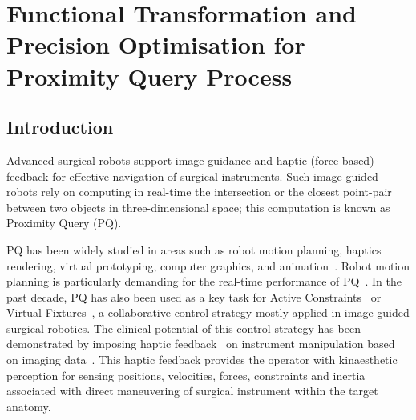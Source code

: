 
\chapter[Functional Transformation \& Precision Optimisation for PQ Process]{Functional Transformation and Precision Optimisation for Proximity Query Process}

\section{Introduction}
\label{sec:intro}

Advanced surgical robots support image guidance and haptic (force-based) feedback for effective navigation of surgical instruments. 
Such image-guided robots rely on computing in real-time the intersection or the closest point-pair
between two objects in three-dimensional space; 
this computation is known as Proximity Query (PQ).

PQ has been widely studied in areas such as robot motion planning, haptics rendering, virtual prototyping, computer graphics, and animation~\cite{gilbert90}.
Robot motion planning is particularly demanding for the real-time performance of PQ~\cite{chakraborty08}. 
In the past decade, PQ has also been used as a key task for Active Constraints~\cite{kwok10} or Virtual Fixtures~\cite{li07}, 
a collaborative control strategy mostly applied in image-guided surgical robotics. 
The clinical potential of this control strategy has been demonstrated by imposing haptic feedback~\cite{constantinescu05} on instrument manipulation based on imaging data~\cite{jakopec03}.
This haptic feedback provides the operator with kinaesthetic perception for sensing positions, velocities, forces, constraints and inertia associated with direct maneuvering of surgical
instrument within the target anatomy.

